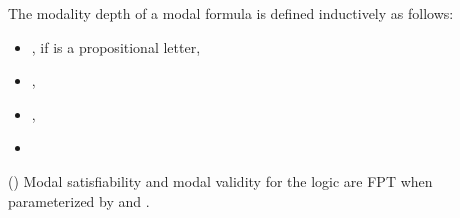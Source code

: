 \documentclass{llncs}
\begin{document}
\begin{definition}
The modality depth of a modal formula  is defined inductively
as follows:
\begin{itemize}
\item , if  is a propositional letter,
\item ,
\item ,
\item 
\end{itemize}
\end{definition}

\begin{theorem} (\cite{DBLP:journals/ai/Halpern95}) \label{thm:depth_upper}
Modal satisfiability and modal validity for the logic  are FPT when parameterized by  and .
\end{theorem}
\end{document}
